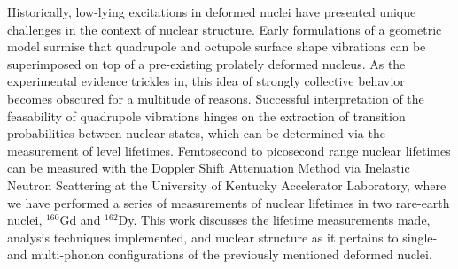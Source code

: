 Historically, low-lying excitations in deformed nuclei have presented unique challenges in the context of nuclear structure. Early formulations of a geometric model surmise that quadrupole and octupole surface shape vibrations can be superimposed on top of a pre-existing prolately deformed nucleus. As the experimental evidence trickles in, this idea of strongly collective behavior becomes obscured for a multitude of reasons. Successful interpretation of the feasability of quadrupole vibrations hinges on the extraction of transition probabilities between nuclear states, which can be determined via the measurement of level lifetimes. Femtosecond to picosecond range nuclear lifetimes can be measured with the Doppler Shift Attenuation Method via Inelastic Neutron Scattering at the University of Kentucky Accelerator Laboratory, where we have performed a series of measurements of nuclear lifetimes in two rare-earth nuclei, $^{160}$Gd and $^{162}$Dy. This work discusses the lifetime measurements made, analysis techniques implemented, and nuclear structure as it pertains to single- and multi-phonon configurations of the previously mentioned deformed nuclei.


